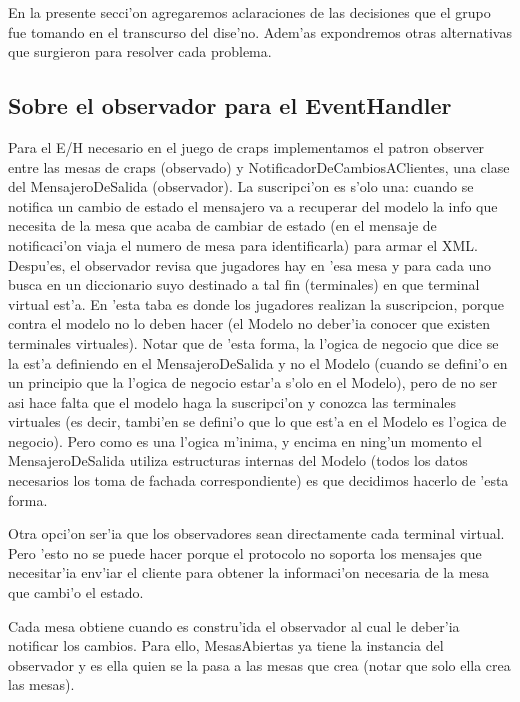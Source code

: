 En la presente secci'on agregaremos aclaraciones de las decisiones que el grupo fue tomando en el transcurso del dise'no. Adem'as expondremos otras alternativas que surgieron para resolver cada problema.

\subsection{Sobre el observador para el EventHandler}
Para el E/H necesario en el juego de craps implementamos el patron observer entre las mesas de craps (observado) y NotificadorDeCambiosAClientes, una clase del MensajeroDeSalida (observador). La suscripci'on es s'olo una: cuando se notifica un cambio de estado el mensajero va a recuperar del modelo la info que necesita de la mesa que acaba de cambiar de estado (en el mensaje de notificaci'on viaja el numero de mesa para identificarla)  para armar el XML. Despu'es, el observador revisa que jugadores hay en 'esa mesa y para cada uno busca en un diccionario suyo destinado a tal fin (terminales) en que terminal virtual est'a. En 'esta taba es donde los jugadores realizan la suscripcion, porque contra el modelo no lo deben hacer (el Modelo no deber'ia conocer que existen terminales virtuales). Notar que de 'esta forma, la l'ogica de negocio que dice  se la est'a definiendo en el MensajeroDeSalida y no el Modelo (cuando se defini'o en un principio que la l'ogica de negocio estar'a s'olo en el Modelo), pero de no ser asi hace falta que el modelo haga la suscripci'on y conozca las terminales virtuales (es decir, tambi'en se defini'o que lo que est'a en el Modelo es l'ogica de negocio). Pero como es una l'ogica m'inima, y encima en ning'un momento el MensajeroDeSalida utiliza estructuras internas del Modelo (todos los datos necesarios los toma de fachada correspondiente) es que decidimos hacerlo de 'esta forma.

Otra opci'on ser'ia que los observadores sean directamente cada terminal virtual. Pero 'esto no se puede hacer porque el protocolo no soporta los mensajes que necesitar'ia env'iar el cliente para obtener la informaci'on necesaria de la mesa que cambi'o el estado.

Cada mesa obtiene cuando es constru'ida el observador al cual le deber'ia notificar los cambios. Para ello, MesasAbiertas ya tiene la instancia del observador y es ella quien se la pasa a las mesas que crea (notar que solo ella crea las mesas).

